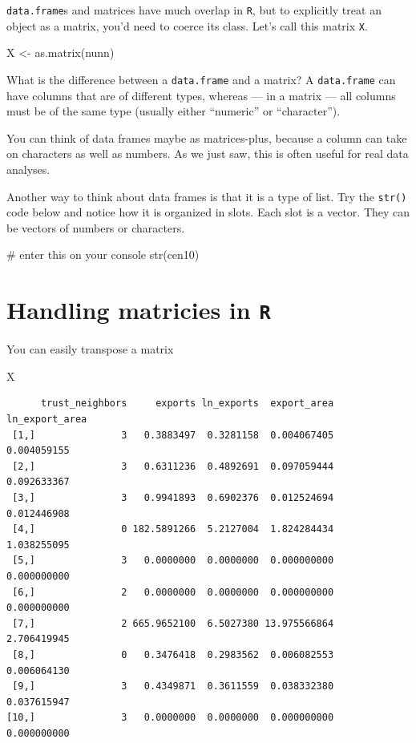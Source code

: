 \documentclass[
  letterpaper,
]{book}
\newenvironment{Shaded}{\begin{snugshade}}{\end{snugshade}}
\newcommand{\CommentTok}[1]{\textcolor[rgb]{0.37,0.37,0.37}{#1}}
\newcommand{\FunctionTok}[1]{\textcolor[rgb]{0.28,0.35,0.67}{#1}}
\newcommand{\NormalTok}[1]{\textcolor[rgb]{0.00,0.23,0.31}{#1}}
\newcommand{\OtherTok}[1]{\textcolor[rgb]{0.00,0.23,0.31}{#1}}
\theoremstyle{definition}
\theoremstyle{definition}
\theoremstyle{plain}
\theoremstyle{definition}
\theoremstyle{plain}
\theoremstyle{plain}
\theoremstyle{remark}
\begin{document}
\texttt{data.frame}s and matrices have much overlap in \texttt{R}, but
to explicitly treat an object as a matrix, you'd need to coerce its
class. Let's call this matrix \texttt{X}.

\begin{Shaded}
\begin{Highlighting}[]
\NormalTok{X }\OtherTok{\textless{}{-}} \FunctionTok{as.matrix}\NormalTok{(nunn)}
\end{Highlighting}
\end{Shaded}

What is the difference between a \texttt{data.frame} and a matrix? A
\texttt{data.frame} can have columns that are of different types,
whereas --- in a matrix --- all columns must be of the same type
(usually either ``numeric'' or ``character'').

You can think of data frames maybe as matrices-plus, because a column
can take on characters as well as numbers. As we just saw, this is often
useful for real data analyses.

Another way to think about data frames is that it is a type of list. Try
the \texttt{str()} code below and notice how it is organized in slots.
Each slot is a vector. They can be vectors of numbers or characters.

\begin{Shaded}
\begin{Highlighting}[]
\CommentTok{\# enter this on your console}
\FunctionTok{str}\NormalTok{(cen10)}
\end{Highlighting}
\end{Shaded}

\hypertarget{handling-matricies-in-r}{%
\section{\texorpdfstring{Handling matricies in
\texttt{R}}{Handling matricies in R}}\label{handling-matricies-in-r}}

You can easily transpose a matrix

\begin{Shaded}
\begin{Highlighting}[]
\NormalTok{X}
\end{Highlighting}
\end{Shaded}

\begin{verbatim}
      trust_neighbors     exports ln_exports  export_area ln_export_area
 [1,]               3   0.3883497  0.3281158  0.004067405    0.004059155
 [2,]               3   0.6311236  0.4892691  0.097059444    0.092633367
 [3,]               3   0.9941893  0.6902376  0.012524694    0.012446908
 [4,]               0 182.5891266  5.2127004  1.824284434    1.038255095
 [5,]               3   0.0000000  0.0000000  0.000000000    0.000000000
 [6,]               2   0.0000000  0.0000000  0.000000000    0.000000000
 [7,]               2 665.9652100  6.5027380 13.975566864    2.706419945
 [8,]               0   0.3476418  0.2983562  0.006082553    0.006064130
 [9,]               3   0.4349871  0.3611559  0.038332380    0.037615947
[10,]               3   0.0000000  0.0000000  0.000000000    0.000000000
\end{verbatim}
\end{document}

